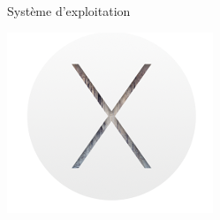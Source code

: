\begin{frame}{Système d'exploitation}
\begin{minipage}{0.25\linewidth}
  \end{minipage}
  \hfill
  \begin{minipage}{0.25\linewidth}
	  \includegraphics[width=\linewidth]{images/logo_osX.png}
  \end{minipage}
\end{frame}

